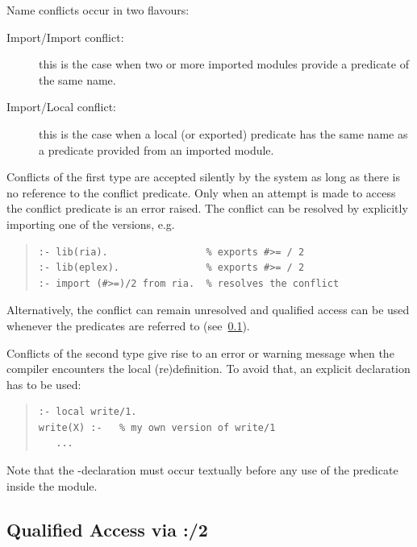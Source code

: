Name conflicts occur in two flavours:
\begin{description}
\item[Import/Import conflict:]
    this is the case when two or more imported modules provide a
    predicate of the same name.
\item[Import/Local conflict:]
    this is the case when a local (or exported) predicate has the
    same name as a predicate provided from an imported module.
\end{description}
Conflicts of the first type are accepted silently by the system as
long as there is no reference to the conflict predicate. Only when an attempt
is made to access the conflict predicate is an error raised.
The conflict can be resolved by explicitly importing one of the versions, e.g.
\begin{quote}\begin{verbatim}
:- lib(ria).                 % exports #>= / 2
:- lib(eplex).               % exports #>= / 2
:- import (#>=)/2 from ria.  % resolves the conflict
\end{verbatim}\end{quote}
Alternatively, the conflict can remain unresolved and qualified access can
be used whenever the predicates are referred to (see~\ref{qualifiedaccess}).

Conflicts of the second type give rise to an error or warning message
when the compiler encounters the local (re)definition. To avoid that,
an explicit
declaration has to be used:
\begin{quote}\begin{verbatim}
:- local write/1.
write(X) :-   % my own version of write/1
   ...
\end{verbatim}\end{quote}
Note that the -declaration
must occur textually before any use of the predicate inside the module.


\subsection{Qualified Access via :/2}
\label{qualifiedaccess}

